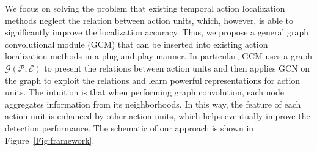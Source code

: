 \documentclass[10pt,journal,compsoc]{IEEEtran}
\begin{document}
	
	We focus on solving the problem that existing temporal action localization methods neglect the relation between action units, which, however, is able to
	significantly improve the localization accuracy. Thus, we propose a general graph convolutional  module (GCM) that can be inserted into existing action localization methods in a plug-and-play manner. In particular, 
	GCM uses a graph $\mathcal{G}(\mathcal{P},\mathcal{E})$ to present the relations between action units and then applies GCN on the graph to exploit the relations and learn powerful representations for action units. The intuition is that when performing graph convolution, each node aggregates information from its neighborhoods. In this way, the feature of each action unit is enhanced by other action units, which helps eventually improve the detection performance. The schematic of our approach is shown in Figure~\ref{Fig:framework}.
	
\end{document}
